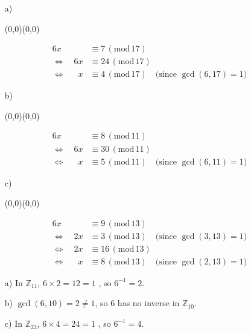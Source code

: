 \documentclass[11pt]{article}
\newcommand{\ph}{\phantom}
\newcommand{\mymod}[1]{\,(\textrm{mod}\,#1)}
\newcommand{\moveup}{\begin{picture}(0,0)(0,0)\end{picture}\vspace*{-8.15mm}}
\begin{document}
\bigskip{}
\begin{itemize}
  \item[a)]\moveup
    \begin{align*}
         6x&\equiv  7\mymod{17}\\\Leftrightarrow\quad
         6x&\equiv 24\mymod{17}\\\Leftrightarrow\quad\ph{6}
          x&\equiv  4\mymod{17}\quad\textrm{(since $\gcd(6,17)=1$)}
    \end{align*}
  \item[b)]\moveup
    \begin{align*}
         6x&\equiv  8\mymod{11}\\\Leftrightarrow\quad
         6x&\equiv 30\mymod{11}\\\Leftrightarrow\quad\ph{6}
          x&\equiv  5\mymod{11}\quad\textrm{(since $\gcd(6,11)=1$)}
    \end{align*}
  \item[c)]\moveup
    \begin{align*}
         6x&\equiv  9\mymod{13}\\\Leftrightarrow\quad
         2x&\equiv  3\mymod{13}\quad\textrm{(since $\gcd(3,13)=1$)}\\\Leftrightarrow\quad
         2x&\equiv 16\mymod{13}\\\Leftrightarrow\quad\ph{2}
          x&\equiv  8\mymod{13}\quad\textrm{(since $\gcd(2,13)=1$)}
    \end{align*}
\end{itemize}


\bigskip{}
\begin{itemize}
  \item[a)] In $\mathbb{Z}_{11}$, $6\times 2 = 12 = 1$ , so $6^{-1} = 2$.
  \item[b)] $\gcd(6,10) = 2\neq 1$, so 6 has no inverse in $\mathbb{Z}_{10}$.
  \item[c)] In $\mathbb{Z}_{23}$, $6\times 4 = 24 = 1$ , so $6^{-1} = 4$.
\end{itemize}
\end{document}
